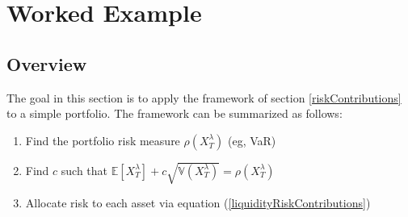 \documentclass[12pt]{article}
\theoremstyle{definition}
\newtheorem{riskmeasure}{Definition}
\begin{document}
















\section{Worked Example}
\subsection{Overview}

The goal in this section is to apply the framework of section \ref{riskContributions} to a simple portfolio.  The framework can be summarized as follows:
\begin{enumerate}
\item Find the portfolio risk measure \(\rho(X_T ^\lambda)\) (eg, VaR)
\item Find \(c\) such that \(\mathbb{E}\left[X_T ^ \lambda\right]+c \sqrt{\mathbb{V}(X_T ^ \lambda)}=\rho(X_T ^ \lambda)\)
\item Allocate risk to each asset via equation (\ref{liquidityRiskContributions})
\end{enumerate}
\end{document}
